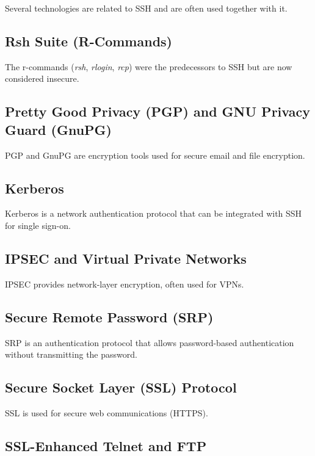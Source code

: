 \documentclass[12pt]{book}
\begin{document}
Several technologies are related to SSH and are often used together with it.

\subsection{Rsh Suite (R-Commands)}

The r-commands (\textit{rsh}, \textit{rlogin}, \textit{rcp}) were the predecessors to SSH but are now considered insecure.

\subsection{Pretty Good Privacy (PGP) and GNU Privacy Guard (GnuPG)}

PGP and GnuPG are encryption tools used for secure email and file encryption.

\subsection{Kerberos}

Kerberos is a network authentication protocol that can be integrated with SSH for single sign-on.

\subsection{IPSEC and Virtual Private Networks}

IPSEC provides network-layer encryption, often used for VPNs.

\subsection{Secure Remote Password (SRP)}

SRP is an authentication protocol that allows password-based authentication without transmitting the password.

\subsection{Secure Socket Layer (SSL) Protocol}

SSL is used for secure web communications (HTTPS).

\subsection{SSL-Enhanced Telnet and FTP}
\end{document}
